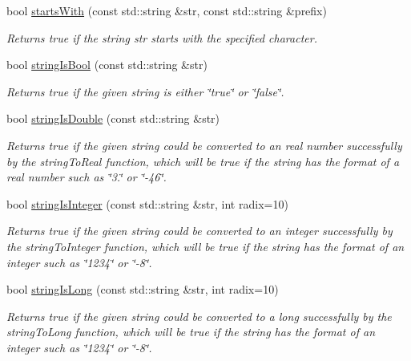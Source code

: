 \begin{DoxyCompactItemize}
bool \mbox{\hyperlink{namespacesgl_1_1priv_1_1strlib_a11c9a498274d9d966fdf7a40305a1be9}{starts\+With}} (const std\+::string \&str, const std\+::string \&prefix)
\begin{DoxyCompactList}\small\item\em Returns {\ttfamily true} if the string {\ttfamily str} starts with the specified character. \end{DoxyCompactList}\item 
bool \mbox{\hyperlink{namespacesgl_1_1priv_1_1strlib_ac05fc94e69329f8d379a801c01105069}{string\+Is\+Bool}} (const std\+::string \&str)
\begin{DoxyCompactList}\small\item\em Returns true if the given string is either \char`\"{}true\char`\"{} or \char`\"{}false\char`\"{}. \end{DoxyCompactList}\item 
bool \mbox{\hyperlink{namespacesgl_1_1priv_1_1strlib_a370a1baccb1cc15a675e64b40d9afad6}{string\+Is\+Double}} (const std\+::string \&str)
\begin{DoxyCompactList}\small\item\em Returns true if the given string could be converted to an real number successfully by the string\+To\+Real function, which will be true if the string has the format of a real number such as \char`\"{}3.\char`\"{} or \char`\"{}-\/46\char`\"{}. \end{DoxyCompactList}\item 
bool \mbox{\hyperlink{namespacesgl_1_1priv_1_1strlib_a5a1194f3117e549291895bdbbe76f85f}{string\+Is\+Integer}} (const std\+::string \&str, int radix=10)
\begin{DoxyCompactList}\small\item\em Returns true if the given string could be converted to an integer successfully by the string\+To\+Integer function, which will be true if the string has the format of an integer such as \char`\"{}1234\char`\"{} or \char`\"{}-\/8\char`\"{}. \end{DoxyCompactList}\item 
bool \mbox{\hyperlink{namespacesgl_1_1priv_1_1strlib_ac7499f39dad1514e946909d251d07ffd}{string\+Is\+Long}} (const std\+::string \&str, int radix=10)
\begin{DoxyCompactList}\small\item\em Returns true if the given string could be converted to a long successfully by the string\+To\+Long function, which will be true if the string has the format of an integer such as \char`\"{}1234\char`\"{} or \char`\"{}-\/8\char`\"{}. \end{DoxyCompactList}\item 

\end{DoxyCompactItemize}
